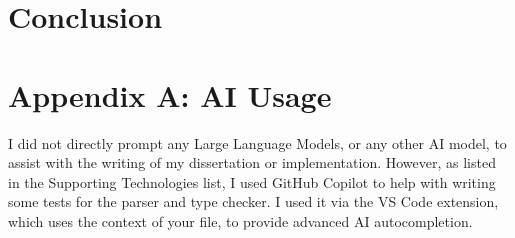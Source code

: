 \documentclass[
author={Kiran Sturt},
degree={BSc},
title={Implementing a Step by Step Evaluator for a Simple Functional Programming language},
unit={COMS30045},]{dissertation}
\theoremstyle{definition}
\theoremstyle{break}
\theoremstyle{definition}
\begin{document}

\chapter{Conclusion}
\label{chap:conclusion}


%
%
%

\backmatter





\appendix

\chapter{Appendix A: AI Usage}
\label{appx:ai_prompt}

I did not directly prompt any Large Language Models, or any other AI model, to assist with the writing of my dissertation or implementation. However, as listed in the Supporting Technologies list, I used GitHub Copilot to help with writing some tests for the parser and type checker. I used it via the VS Code extension, which uses the context of your file, to provide advanced AI autocompletion.

\end{document}
